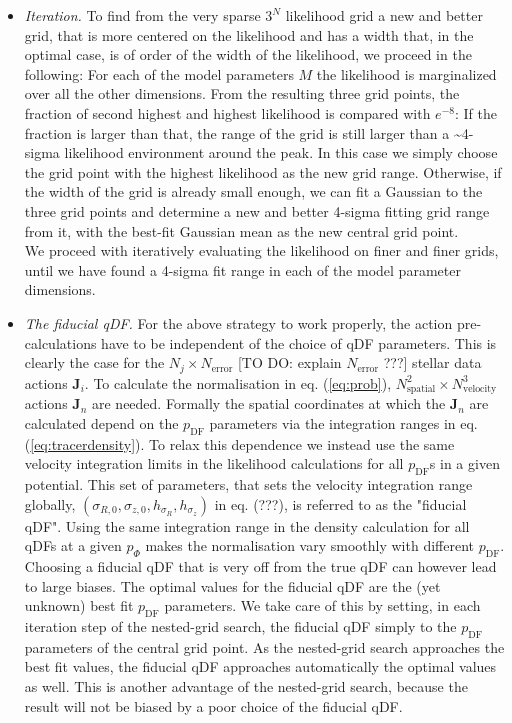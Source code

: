\documentclass[12pt,preprint]{aastex}
\newcommand{\vect}[1]{\boldsymbol{#1}} %
\begin{document}
\begin{itemize}
\item \emph{Iteration.} To find from the very sparse $3^N$ likelihood grid a new and better grid, that is more centered on the likelihood and has a width that, in the optimal case, is of order of the width of the likelihood, we proceed in the following: For each of the model parameters $M$ the likelihood is marginalized over all the other dimensions. From the resulting three grid points, the fraction of second highest and highest likelihood is compared with $e^{-8}$: If the fraction is larger than that, the range of the grid is still larger than a \textasciitilde 4-sigma likelihood environment around the peak. In this case we simply choose the grid point with the highest likelihood as the new grid range. Otherwise, if the width of the grid is already small enough, we can fit a Gaussian to the three grid points and determine a new and better 4-sigma fitting grid range from it, with the best-fit Gaussian mean as the new central grid point. 
\\We proceed with iteratively evaluating the likelihood on finer and finer grids, until we have found a 4-sigma fit range in each of the model parameter dimensions.

\item \emph{The fiducial qDF.} For the above strategy to work properly, the action pre-calculations have to be independent of the choice of qDF parameters. This is clearly the case for the $N_j \times N_\text{error}$ [TO DO: explain $N_\text{error}$ ???]  stellar data actions $\vect{J}_i$. To calculate the normalisation in eq. (\ref{eq:prob}), $N_\text{spatial}^2 \times N_\text{velocity}^3$ actions $\vect{J}_n$ are needed. Formally the spatial coordinates at which the $\vect{J}_n$ are calculated depend on the $p_\text{DF}$ parameters via the integration ranges in eq. (\ref{eq:tracerdensity}). To relax this dependence we instead use the same velocity integration limits in the likelihood calculations for all $p_\text{DF}$s in a given potential. This set of parameters, that sets the velocity integration range globally, $(\sigma_{R,0},\sigma_{z,0},h_{\sigma_R},h_{\sigma_z})$ in eq. (???), is referred to as the "fiducial qDF". Using the same integration range in the density calculation for all qDFs at a given $p_\Phi$ makes the normalisation vary smoothly with different $p_\text{DF}$. Choosing a fiducial qDF that is very off from the true qDF can however lead to large biases. The optimal values for the fiducial qDF are the (yet unknown) best fit $p_\text{DF}$ parameters. We take care of this by setting, in each iteration step of the nested-grid search, the fiducial qDF simply to the $p_\text{DF}$ parameters of the central grid point.  As the nested-grid search approaches the best fit values, the fiducial qDF approaches automatically the optimal values as well. This is another advantage of the nested-grid search, because the result will not be biased by a poor choice of the fiducial qDF.


\end{itemize}
\end{document}
